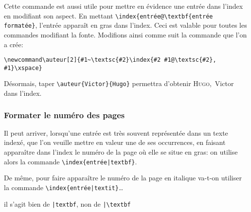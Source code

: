 Cette commande est aussi utile pour mettre en évidence une entrée dans l'index en modifiant son aspect. En mettant \verb+\index{entrée@\textbf{entrée formatée}+, l'entrée apparaît en gras dans l'index. Ceci est valable pour toutes les commandes modifiant la fonte. Modifions ainsi comme suit la commande  que l'on a crée:

\begin{verbatim}
\newcommand\auteur[2]{#1~\textsc{#2}\index{#2 #1@\textsc{#2}, #1}\xspace}
\end{verbatim}

Désormais, taper \verb|\auteur{Victor}{Hugo}| permettra d'obtenir \textsc{Hugo},~Victor dans l'index.
 
 
 
\subsubsection{Formater le numéro des pages}

Il peut arriver, lorsqu'une entrée est très souvent représentée dans un texte indexé, que l'on veuille mettre en valeur une de ses occurrences, en faisant apparaître dans l'index le numéro de la page où elle se situe en gras: on utilise alors la commande \verb+\index{entrée|textbf}+. 

De même, pour faire apparaître le numéro de la page en italique va-t-on utiliser la commande \verb+\index{entrée|textit}+…

\begin{attention}
il s'agit bien de \verb+|textbf+, non de \verb+|\textbf+

\end{attention}






